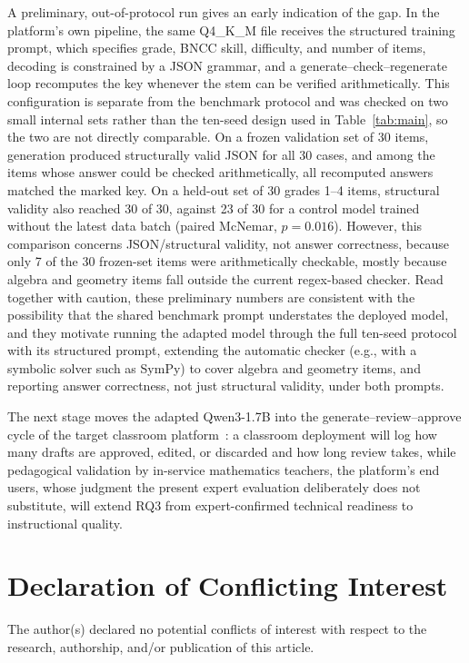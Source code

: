 \documentclass[fleqn,10pt]{JLA_article}
\begin{document}
A preliminary, out-of-protocol run gives an early indication of the gap. In the platform's own pipeline, the same Q4\_K\_M file receives the structured training prompt, which specifies grade, BNCC skill, difficulty, and number of items, decoding is constrained by a JSON grammar, and a generate--check--regenerate loop recomputes the key whenever the stem can be verified arithmetically. This configuration is separate from the benchmark protocol and was checked on two small internal sets rather than the ten-seed design used in Table~\ref{tab:main}, so the two are not directly comparable. On a frozen validation set of 30 items, generation produced structurally valid JSON for all 30 cases, and among the items whose answer could be checked arithmetically, all recomputed answers matched the marked key. On a held-out set of 30 grades 1--4 items, structural validity also reached 30 of 30, against 23 of 30 for a control model trained without the latest data batch (paired McNemar, $p = 0.016$). However, this comparison concerns JSON/structural validity, not answer correctness, because only 7 of the 30 frozen-set items were arithmetically checkable, mostly because algebra and geometry items fall outside the current regex-based checker. Read together with caution, these preliminary numbers are consistent with the possibility that the shared benchmark prompt understates the deployed model, and they motivate running the adapted model through the full ten-seed protocol with its structured prompt, extending the automatic checker (e.g., with a symbolic solver such as SymPy) to cover algebra and geometry items, and reporting answer correctness, not just structural validity, under both prompts.

The next stage moves the adapted Qwen3-1.7B into the generate--review--approve cycle of the target classroom platform~\autocite{guerino2025mathaide,rosa2026automated}: a classroom deployment will log how many drafts are approved, edited, or discarded and how long review takes, while pedagogical validation by in-service mathematics teachers, the platform's end users, whose judgment the present expert evaluation deliberately does not substitute, will extend RQ3 from expert-confirmed technical readiness to instructional quality.
\section*{Declaration of Conflicting Interest}
The author(s) declared no potential conflicts of interest with respect to the research, authorship, and/or publication of this article.
\printbibliography
\end{document}
